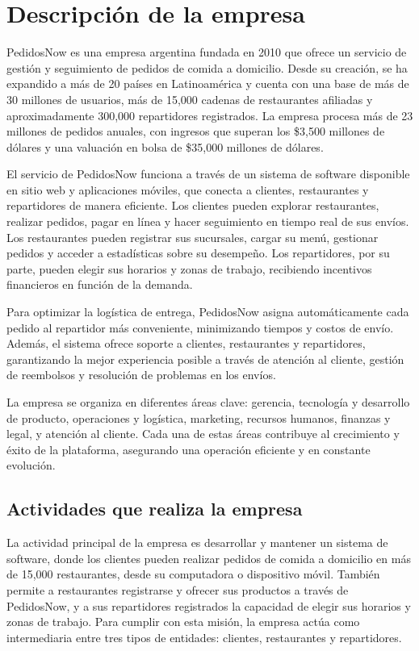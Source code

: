 
\section{Descripción de la empresa}

PedidosNow es una empresa argentina fundada en 2010 que ofrece un servicio de gestión y seguimiento de pedidos de comida a domicilio. Desde su creación, se ha expandido a más de 20 países en Latinoamérica y cuenta con una base de más de 30 millones de usuarios, más de 15,000 cadenas de restaurantes afiliadas y aproximadamente 300,000 repartidores registrados. La empresa procesa más de 23 millones de pedidos anuales, con ingresos que superan los \$3,500 millones de dólares y una valuación en bolsa de \$35,000 millones de dólares.

El servicio de PedidosNow funciona a través de un sistema de software disponible en sitio web y aplicaciones móviles, que conecta a clientes, restaurantes y repartidores de manera eficiente. Los clientes pueden explorar restaurantes, realizar pedidos, pagar en línea y hacer seguimiento en tiempo real de sus envíos. Los restaurantes pueden registrar sus sucursales, cargar su menú, gestionar pedidos y acceder a estadísticas sobre su desempeño. Los repartidores, por su parte, pueden elegir sus horarios y zonas de trabajo, recibiendo incentivos financieros en función de la demanda.

Para optimizar la logística de entrega, PedidosNow asigna automáticamente cada pedido al repartidor más conveniente, minimizando tiempos y costos de envío. Además, el sistema ofrece soporte a clientes, restaurantes y repartidores, garantizando la mejor experiencia posible a través de atención al cliente, gestión de reembolsos y resolución de problemas en los envíos.

La empresa se organiza en diferentes áreas clave: gerencia, tecnología y desarrollo de producto, operaciones y logística, marketing, recursos humanos, finanzas y legal, y atención al cliente. Cada una de estas áreas contribuye al crecimiento y éxito de la plataforma, asegurando una operación eficiente y en constante evolución.

\subsection{Actividades que realiza la empresa}

La actividad principal de la empresa es desarrollar y mantener un sistema de software, donde los clientes pueden realizar pedidos de comida a domicilio en más de 15,000 restaurantes, desde su computadora o dispositivo móvil. También permite a restaurantes registrarse y ofrecer sus productos a través de PedidosNow, y a sus repartidores registrados la capacidad de elegir sus horarios y zonas de trabajo. Para cumplir con esta misión, la empresa actúa como intermediaria entre tres tipos de entidades: clientes, restaurantes y repartidores.

